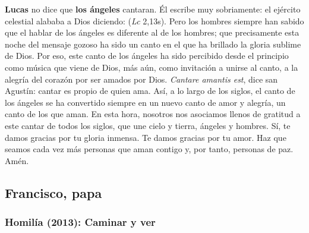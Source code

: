 \begin{body}
	\textbf{Lucas} no dice que \textbf{los ángeles} cantaran. Él escribe muy sobriamente: el ejército celestial alababa a Dios diciendo:  (\emph{Lc} 2,13s). Pero los hombres siempre han sabido que el hablar de los ángeles es diferente al de los hombres; que precisamente esta noche del mensaje gozoso ha sido un canto en el que ha brillado la gloria sublime de Dios. Por eso, este canto de los ángeles ha sido percibido desde el principio como música que viene de Dios, más aún, como invitación a unirse al canto, a la alegría del corazón por ser amados por Dios. \emph{Cantare amantis est}, dice san Agustín: cantar es propio de quien ama. Así, a lo largo de los siglos, el canto de los ángeles se ha convertido siempre en un nuevo canto de amor y alegría, un canto de los que aman. En esta hora, nosotros nos asociamos llenos de gratitud a este cantar de todos los siglos, que une cielo y tierra, ángeles y hombres. Sí, te damos gracias por tu gloria inmensa. Te damos gracias por tu amor. Haz que seamos cada vez más personas que aman contigo y, por tanto, personas de paz. Amén.
\end{body}

\newsection			

\subsection{Francisco, papa}

\subsubsection{Homilía (2013): Caminar y ver}


